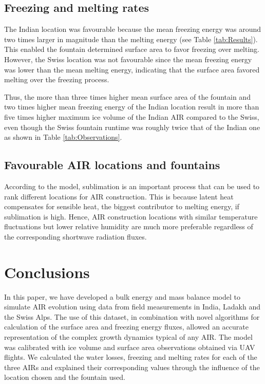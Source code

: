 \documentclass[utf8]{frontiersSCNS} %
\begin{document}
\subsection{Freezing and melting rates}

The Indian location was favourable because the mean freezing energy was around two times larger in magnitude than the
melting energy (see Table \ref{tab:Results}). This enabled the fountain determined surface area to favor freezing over melting. However, the
Swiss location was not favourable since the mean freezing energy was lower than the mean melting energy, indicating that the
surface area favored melting over the freezing process.

Thus, the more than three times higher mean surface area of the fountain and two times higher mean freezing energy of the Indian
location result in more than five times higher maximum ice volume of the Indian AIR compared to the Swiss, even though the Swiss
fountain runtime was roughly twice that of the Indian one as shown in Table \ref{tab:Observations}.

\subsection{Favourable AIR locations and fountains}

According to the model, sublimation is an important process that can be used to rank different locations for AIR
construction. This is because latent heat compensates for sensible heat, the biggest contributor to melting energy,
if sublimation is high. Hence, AIR construction locations with similar temperature fluctuations but lower relative
humidity are much more preferable regardless of the corresponding shortwave radiation fluxes.

\section{Conclusions}

In this paper, we have developed a bulk energy and mass balance model to simulate AIR evolution using data from
field measurements in India, Ladakh and the Swiss Alps. The use of this dataset, in combination with novel
algorithms for calculation of the surface area and freezing energy fluxes, allowed an accurate representation of
the complex growth dynamics typical of any AIR. The model was calibrated with ice volume and surface area
observations obtained via UAV flights. We calculated the water losses, freezing and melting rates for each of
the three AIRs and explained their corresponding values through the influence of the location chosen and the
fountain used.
\end{document}
